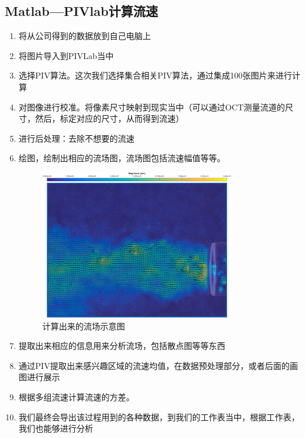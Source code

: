 \documentclass[12pt]{article}
\begin{document}
\begin{enumerate}
\begin{itemize}
    \end{itemize}
    \subsection{Matlab—PIVlab计算流速}
    \begin{enumerate}
        \item 将从公司得到的数据放到自己电脑上
        \item 将图片导入到PIVLab当中
        \item 选择PIV算法。这次我们选择集合相关PIV算法，通过集成100张图片来进行计算
        \item 对图像进行校准。将像素尺寸映射到现实当中（可以通过OCT测量流道的尺寸，然后，标定对应的尺寸，从而得到流速）
        \item 进行后处理：去除不想要的流速
        \item 绘图，绘制出相应的流场图，流场图包括流速幅值等等。
        
        \begin{figure}
            \centering
            \includegraphics[width=0.8\textwidth]{Images/经过Matlab处理后的图片.png}
            \caption{计算出来的流场示意图}
        \end{figure}
        \item 提取出来相应的信息用来分析流场，包括散点图等等东西
        \item 通过PIV提取出来感兴趣区域的流速均值，在数据预处理部分，或者后面的画图进行展示
        \item 根据多组流速计算流速的方差。
        \item 我们最终会导出该过程用到的各种数据，到我们的工作表当中，根据工作表，我们也能够进行分析
    \end{enumerate}
    



\end{enumerate}
\end{document}
